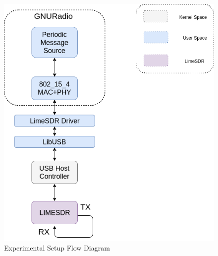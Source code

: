 \begin{figure}[h!]
\centering
\includegraphics[scale=0.6]{Thesis/Figure/Setup_Description.png}
\caption{Experimental Setup Flow Diagram}
\label{Experimental_Setup_Flow_Digram}
\end{figure}


